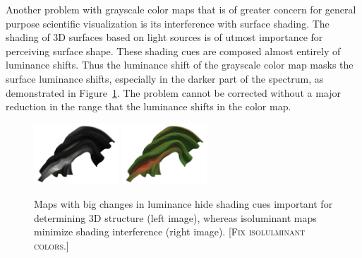 \documentclass[review,journal]{vgtc}         %
\newcommand{\sticky}[1]{\textsc{[#1]}}
\begin{document}

Another problem with grayscale color maps that is of greater concern for
general purpose scientific visualization is its interference with surface
shading.  The shading of 3D surfaces based on light sources is of utmost
importance for perceiving surface shape.  These shading cues are
composed almost entirely of luminance shifts.  Thus the luminance shift of
the grayscale color map masks the surface luminance shifts, especially in
the darker part of the spectrum, as demonstrated in
Figure~\ref{fig:LuminanceVsShading}.  The problem cannot be corrected
without a major reduction in the range that the luminance shifts in the color
map.

\begin{figure}
  \centering
  \includegraphics[width=1.25in]{images/GrayscaleShading}
  \includegraphics[width=1.25in]{images/Green2RedShading}
  \caption{Maps with big changes in luminance hide shading cues important
    for determining 3D structure (left image), whereas isoluminant maps
    minimize shading interference (right image). \sticky{Fix isolulminant colors.}}
  \label{fig:LuminanceVsShading}
\end{figure}
\end{document}
